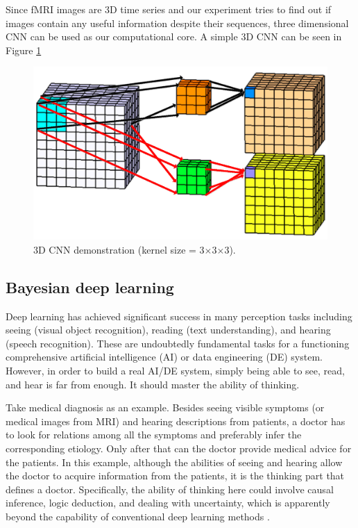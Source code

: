 \documentclass[a4paper,fleqn]{cas-dc}
\begin{document}
Since fMRI images are 3D time series and our experiment tries to find out if images contain any useful information despite their sequences, three dimensional CNN can be used as our computational core. A simple 3D CNN can be seen in Figure \ref{fig:CnnSample}

\begin{figure}
	\includegraphics[width=0.8\linewidth]{images/3dCnn}
	\caption{3D CNN demonstration (kernel size = 3$\times$3$\times$3).}
	\label{fig:CnnSample}
\end{figure}




\subsection{Bayesian deep learning}
\label{section:bayesianDL}
Deep learning has achieved significant success in many perception tasks including seeing (visual object recognition), reading (text understanding), and hearing (speech recognition). These are undoubtedly fundamental tasks for a functioning comprehensive artificial intelligence (AI) or data engineering (DE) system. However, in order to build a real AI/DE system, simply being able to see, read, and hear is far from enough. It should master
the ability of thinking.

Take medical diagnosis as an example. Besides seeing
visible symptoms (or medical images from MRI) and hearing descriptions from patients, a doctor has to look for relations among all the symptoms and preferably infer the corresponding etiology. Only after that can the doctor provide medical advice for the patients. In this example, although the abilities of seeing and hearing allow the doctor to acquire information from the patients, it is the thinking part that defines a doctor. Specifically, the ability of thinking here could involve causal inference, logic deduction, and dealing with uncertainty, which is apparently beyond the capability of conventional deep learning methods \cite{Wang2016}.
\end{document}

